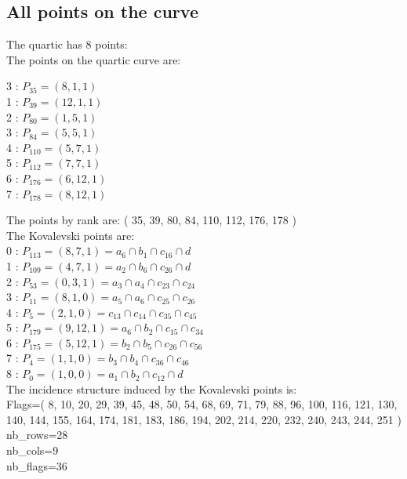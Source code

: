 \documentclass{article}
\begin{document}
{\subsection*{All points on the curve}
The quartic has 8 points:\\
The points on the quartic curve are:\\
\begin{multicols}{3}
 : $P_{35}=( 8, 1, 1 )$\\
1 : $P_{39}=( 12, 1, 1 )$\\
2 : $P_{80}=( 1, 5, 1 )$\\
3 : $P_{84}=( 5, 5, 1 )$\\
4 : $P_{110}=( 5, 7, 1 )$\\
5 : $P_{112}=( 7, 7, 1 )$\\
6 : $P_{176}=( 6, 12, 1 )$\\
7 : $P_{178}=( 8, 12, 1 )$\\
\end{multicols}
The points by rank are: 
( 35, 39, 80, 84, 110, 112, 176, 178 )\\
The Kovalevski points are: \\
0 : $P_{113}=( 8, 7, 1 ) = a_{6} \cap b_{1} \cap c_{16} \cap d$\\
1 : $P_{109}=( 4, 7, 1 ) = a_{2} \cap b_{6} \cap c_{26} \cap d$\\
2 : $P_{53}=( 0, 3, 1 ) = a_{3} \cap a_{4} \cap c_{23} \cap c_{24}$\\
3 : $P_{11}=( 8, 1, 0 ) = a_{5} \cap a_{6} \cap c_{25} \cap c_{26}$\\
4 : $P_{5}=( 2, 1, 0 ) = c_{13} \cap c_{14} \cap c_{35} \cap c_{45}$\\
5 : $P_{179}=( 9, 12, 1 ) = a_{6} \cap b_{2} \cap c_{15} \cap c_{34}$\\
6 : $P_{175}=( 5, 12, 1 ) = b_{2} \cap b_{5} \cap c_{26} \cap c_{56}$\\
7 : $P_{4}=( 1, 1, 0 ) = b_{3} \cap b_{4} \cap c_{36} \cap c_{46}$\\
8 : $P_{0}=( 1, 0, 0 ) = a_{1} \cap b_{2} \cap c_{12} \cap d$\\
The incidence structure induced by the Kovalevski points is: 
\\
Flags=( 8, 10, 20, 29, 39, 45, 48, 50, 54, 68, 69, 71, 79, 88, 96, 100, 116, 121, 130, 140, 144, 155, 164, 174, 181, 183, 186, 194, 202, 214, 220, 232, 240, 243, 244, 251 )\\
nb\_rows=28\\
nb\_cols=9\\
nb\_flags=36\\
}
\end{document}
